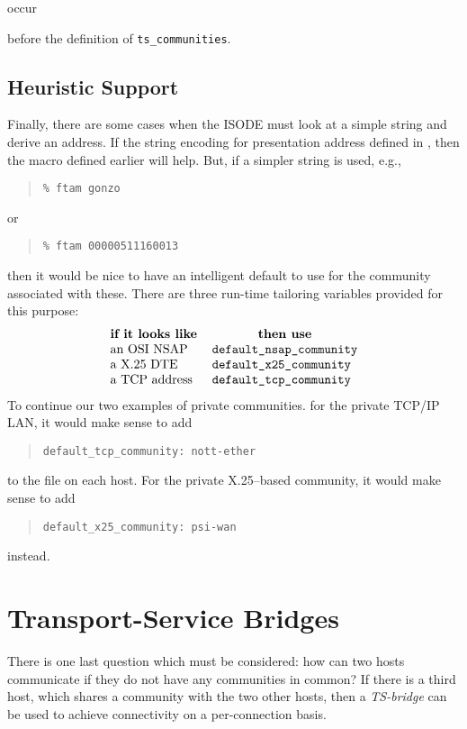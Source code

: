 occur {before the definition of \verb"ts_communities".

\subsection	{Heuristic Support}
Finally,
there are some cases when the ISODE must look at a simple string and derive an
address. 
If the string encoding for presentation address defined in
\cite{String.Addresses},
then the macro defined earlier will help.
But,
if a simpler string is used,
e.g.,
\begin{quote}\small\begin{verbatim}
% ftam gonzo
\end{verbatim}\end{quote}
or
\begin{quote}\small\begin{verbatim}
% ftam 00000511160013
\end{verbatim}\end{quote}
then it would be nice to have an intelligent default to use for the community
associated with these.
There are three run-time tailoring variables provided for this purpose:
\[\begin{tabular}{ll}
\multicolumn{1}{c}{\bf if it looks like}&
		\multicolumn{1}{c}{\bf then use}\\
an OSI NSAP&	\verb"default_nsap_community"\\
a X.25 DTE&	\verb"default_x25_community"\\
a TCP address&	\verb"default_tcp_community"
\end{tabular}\]
To continue our two examples of private communities.
for the private TCP/IP LAN,
it would make sense to add
\begin{quote}\small\begin{verbatim}
default_tcp_community: nott-ether
\end{verbatim}\end{quote}
to the  file on each host.
For the private X.25--based community,
it would make sense to add
\begin{quote}\small\begin{verbatim}
default_x25_community: psi-wan
\end{verbatim}\end{quote}
instead.

\section	{Transport-Service Bridges}
There is one last question which must be considered:
how can two hosts communicate if they do not have any communities in common?
If there is a third host,
which shares a community with the two other hosts,
then a {\em TS-bridge\/} can be used to achieve connectivity on
a per-connection basis.

}
